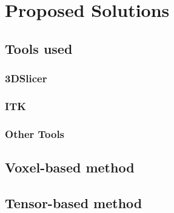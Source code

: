\chapter{Proposed Solutions}

\section{Tools used}
\subsection{3DSlicer}
\subsection{ITK}
\subsection{Other Tools}

\section{Voxel-based method}

\section{Tensor-based method}